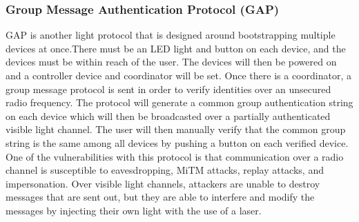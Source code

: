 \subsubsection{Group Message Authentication Protocol (GAP)}
GAP is another light protocol that is designed around bootstrapping multiple devices at once.There must be an LED light and button on each device, and the devices must be within reach of the user. The devices will then be powered on and a controller device and coordinator will be set. Once there is a coordinator, a group message protocol is sent in order to verify identities over an unsecured radio frequency. The protocol will generate a common group authentication string on each device which will then be broadcasted over a partially authenticated visible light channel. The user will then manually verify that the common group string is the same among all devices by pushing a button on each verified device. One of the vulnerabilities with this protocol is that communication over a radio channel is susceptible to eavesdropping, MiTM attacks, replay attacks, and impersonation. Over visible light channels, attackers are unable to destroy messages that are sent out, but they are able to interfere and modify the messages by injecting their own light with the use of a laser. 


